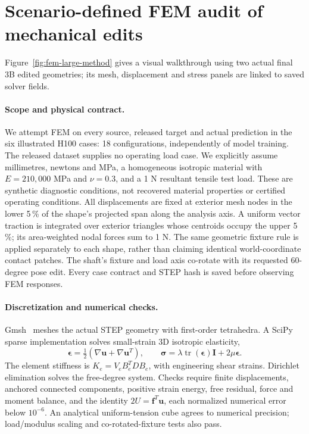 \section{Scenario-defined FEM audit of mechanical edits}
\label{sec:mechanical-fem}
Figure~\ref{fig:fem-large-method} gives a visual walkthrough using two actual final 3B edited geometries; its mesh, displacement and stress panels are linked to saved solver fields.
\paragraph{Scope and physical contract.}
We attempt FEM on every source, released target and actual prediction in the six illustrated H100 cases: 18 configurations, independently of model training. The released dataset supplies no operating load case. We explicitly assume millimetres, newtons and MPa, a homogeneous isotropic material with $E=210{,}000$ MPa and $\nu=0.3$, and a 1 N resultant tensile test load. These are synthetic diagnostic conditions, not recovered material properties or certified operating conditions. All displacements are fixed at exterior mesh nodes in the lower 5\,\% of the shape's projected span along the analysis axis. A uniform vector traction is integrated over exterior triangles whose centroids occupy the upper 5\,\%; its area-weighted nodal forces sum to 1 N. The same geometric fixture rule is applied separately to each shape, rather than claiming identical world-coordinate contact patches. The shaft's fixture and load axis co-rotate with its requested 60-degree pose edit. Every case contract and STEP hash is saved before observing FEM responses.

\paragraph{Discretization and numerical checks.}
Gmsh~\cite{geuzaine2009gmsh} meshes the actual STEP geometry with first-order tetrahedra. A SciPy sparse implementation solves small-strain 3D isotropic elasticity,
\begin{equation}
\boldsymbol\epsilon=\tfrac12(\nabla\mathbf u+\nabla\mathbf u^T),\qquad
\boldsymbol\sigma=\lambda\operatorname{tr}(\boldsymbol\epsilon)\mathbf I+2\mu\boldsymbol\epsilon.
\end{equation}
The element stiffness is $K_e=V_e B_e^T D B_e$, with engineering shear strains. Dirichlet elimination solves the free-degree system. Checks require finite displacements, anchored connected components, positive strain energy, free residual, force and moment balance, and the identity $2U=\mathbf f^T\mathbf u$, each normalized numerical error below $10^{-6}$. An analytical uniform-tension cube agrees to numerical precision; load/modulus scaling and co-rotated-fixture tests also pass.

